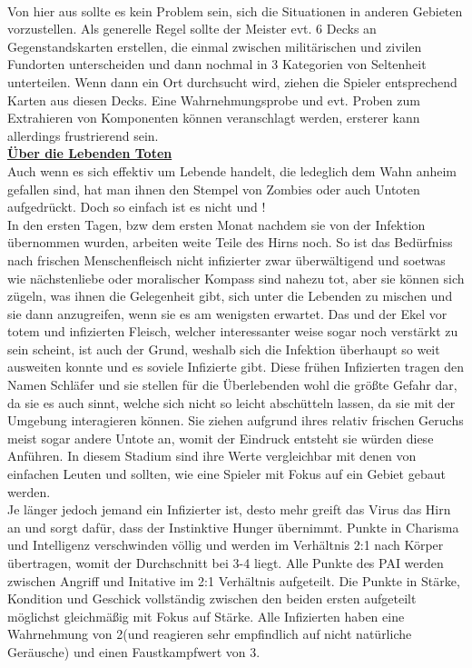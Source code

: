 \documentclass[twoside,a4paper]{minimal}
\begin{document}
\begin{multicols*}{3}
\\Von hier aus sollte es kein Problem sein, sich die Situationen in anderen Gebieten vorzustellen. Als generelle Regel sollte der Meister evt. 6 Decks an Gegenstandskarten erstellen, die einmal zwischen militärischen und zivilen Fundorten unterscheiden und dann nochmal in 3 Kategorien von Seltenheit unterteilen. Wenn dann ein Ort durchsucht wird, ziehen die Spieler entsprechend Karten aus diesen Decks. Eine Wahrnehmungsprobe und evt. Proben zum Extrahieren von Komponenten können veranschlagt werden, ersterer kann allerdings frustrierend sein.
\textbf{\uline{\\Über die Lebenden Toten}}
\\Auch wenn es sich effektiv um Lebende handelt, die ledeglich dem Wahn anheim gefallen sind, hat man ihnen den Stempel von Zombies oder auch Untoten aufgedrückt. Doch so einfach ist es nicht und !
\\In den ersten Tagen, bzw dem ersten Monat nachdem sie von der Infektion übernommen wurden, arbeiten weite Teile des Hirns noch. So ist das Bedürfniss nach frischen Menschenfleisch nicht infizierter zwar überwältigend und soetwas wie nächstenliebe oder moralischer Kompass sind nahezu tot, aber sie können sich zügeln, was ihnen die Gelegenheit gibt, sich unter die Lebenden zu mischen und sie dann anzugreifen, wenn sie es am wenigsten erwartet. Das und der Ekel vor totem und infizierten Fleisch, welcher interessanter weise sogar noch verstärkt zu sein scheint, ist auch der Grund, weshalb sich die Infektion überhaupt so weit ausweiten konnte und es soviele Infizierte gibt. Diese frühen Infizierten tragen den Namen Schläfer und sie stellen für die Überlebenden wohl die größte Gefahr dar, da sie es auch sinnt, welche sich nicht so leicht abschütteln lassen, da sie mit der Umgebung interagieren können. Sie ziehen aufgrund ihres relativ frischen Geruchs meist sogar andere Untote an, womit der Eindruck entsteht sie würden diese Anführen. In diesem Stadium sind ihre Werte vergleichbar mit denen von einfachen Leuten und sollten, wie eine Spieler mit Fokus auf ein Gebiet gebaut werden.
\\Je länger jedoch jemand ein Infizierter ist, desto mehr greift das Virus das Hirn an und sorgt dafür, dass der Instinktive Hunger übernimmt. Punkte in Charisma und Intelligenz verschwinden völlig und werden im Verhältnis 2:1 nach Körper übertragen, womit der Durchschnitt bei 3-4 liegt. Alle Punkte des PAI werden zwischen Angriff und Initative im 2:1 Verhältnis aufgeteilt. Die Punkte in Stärke, Kondition und Geschick vollständig zwischen den beiden ersten aufgeteilt möglichst gleichmäßig mit Fokus auf Stärke. Alle Infizierten haben eine Wahrnehmung von 2(und reagieren sehr empfindlich auf nicht natürliche Geräusche) und einen Faustkampfwert von 3.

\end{multicols*}
\end{document}
